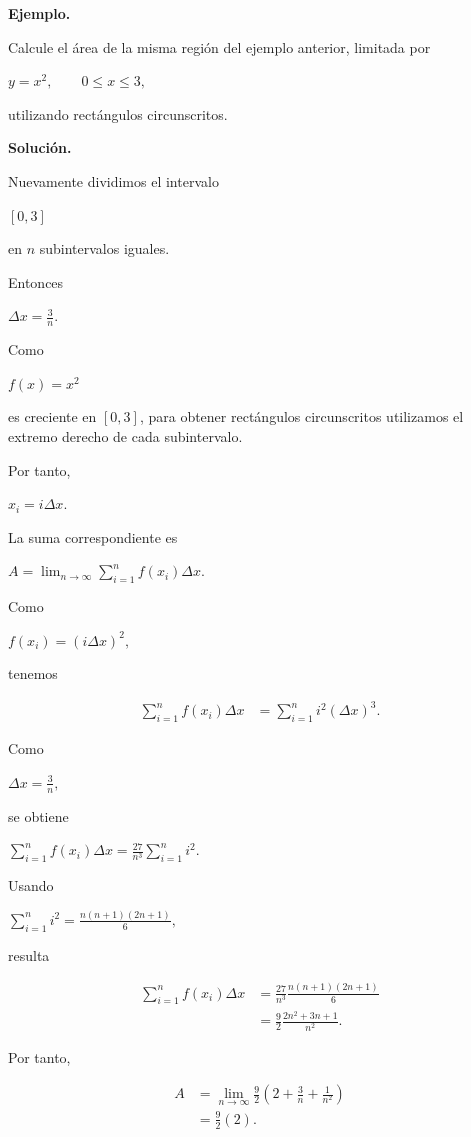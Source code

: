 \documentclass[12pt]{article}
\newenvironment{Ejem}
{\par\medskip\noindent\textbf{Ejemplo.}\ }
{\par\medskip}
\begin{document}

\begin{Ejem}

Calcule el área de la misma región del ejemplo anterior, limitada por

$
y=x^2,
\qquad
0\leq x\leq3,
$

utilizando rectángulos circunscritos.

\textbf{Solución.}

Nuevamente dividimos el intervalo

$
[0,3]
$

en $n$ subintervalos iguales.

Entonces

$
\Delta x
=
\frac{3}{n}.
$

Como

$
f(x)=x^2
$

es creciente en $[0,3]$, para obtener rectángulos circunscritos utilizamos
el extremo derecho de cada subintervalo.

Por tanto,

$
x_i=i\Delta x.
$

La suma correspondiente es

$
A
=
\lim_{n\to\infty}
\sum_{i=1}^{n}
f(x_i)\Delta x.
$

Como

$
f(x_i)
=
(i\Delta x)^2,
$

tenemos

\begin{align*}
\sum_{i=1}^{n}
f(x_i)\Delta x
&=
\sum_{i=1}^{n}
i^2(\Delta x)^3.
\end{align*}

Como

$
\Delta x=\frac{3}{n},
$

se obtiene

$
\sum_{i=1}^{n}
f(x_i)\Delta x
=
\frac{27}{n^3}
\sum_{i=1}^{n}i^2.
$

Usando

$
\sum_{i=1}^{n}i^2
=
\frac{n(n+1)(2n+1)}{6},
$

resulta

\begin{align*}
\sum_{i=1}^{n}
f(x_i)\Delta x
&=
\frac{27}{n^3}
\frac{n(n+1)(2n+1)}{6}\\
&=
\frac{9}{2}
\frac{2n^2+3n+1}{n^2}.
\end{align*}

Por tanto,

\begin{align*}
A
&=
\lim_{n\to\infty}
\frac{9}{2}
\left(
2+\frac{3}{n}+\frac{1}{n^2}
\right)\\
&=
\frac{9}{2}(2).
\end{align*}


\end{Ejem}
\end{document}
